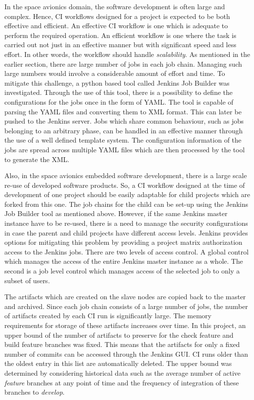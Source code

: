 \documentclass[12pt, a4paper, titlepage]{scrartcl}
\newcommand{\courierword}[1]{\textsf{\itshape #1}}{\fontfamily{pcr}\selectfont}%
\begin{document}
\par In the space avionics domain, the software development is often large and complex. Hence, CI workflows designed for a project is expected to be both effective and efficient. An effective CI workflow is one which is adequate to perform the required operation. An efficient workflow is one where the task is carried out not just in an effective manner but with significant speed and less effort. In other words, the workflow should handle \emph{scalability}. As mentioned in the earlier section, there are large number of jobs in each job chain. Managing such large numbers would involve a considerable amount of effort and time. To mitigate this challenge, a python based tool called Jenkins Job Builder was investigated. Through the use of this tool, there is a possibility to define the configurations for the jobs once in the form of YAML. The tool is capable of parsing the YAML files and converting them to XML format. This can later be pushed to the Jenkins server. Jobs which share common behaviour, such as jobs belonging to an arbitrary phase, can be handled in an effective manner through the use of a well defined template system. The configuration information of the jobs are spread across multiple YAML files which are then processed by the tool to generate the XML. 
\par Also, in the space avionics embedded software development, there is a large scale re-use of developed software products. So, a CI workflow designed at the time of development of one project should be easily adaptable for child projects which are forked from this one. The job chains for the child can be set-up using the Jenkins Job Builder tool as mentioned above. However, if the same Jenkins master instance have to be re-used, there is a need to manage the security configurations in case the parent and child projects have different access levels. Jenkins provides options for mitigating this problem by providing a project matrix authorization access to the Jenkins jobs. There are two levels of access control. A global control which manages the access of the entire Jenkins master instance as a whole. The second is a job level control which manages access of the selected job to only a subset of users. 
\par The artifacts which are created on the slave nodes are copied back to the master and archived. Since each job chain consists of a large number of jobs, the number of artifacts created by each CI run is significantly large. The memory requirements for storage of these artifacts increases over time. In this project, an upper bound of the number of artifacts to preserve for the check feature and build feature branches was fixed. This means that the artifacts for only a fixed number of commits can be accessed through the Jenkins GUI. CI runs older than the oldest entry in this list are automatically deleted. The upper bound was determined by considering historical data such as the average number of active \courierword{feature} branches at any point of time and the frequency of integration of these branches to \courierword{develop}. 
\end{document}
